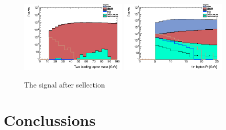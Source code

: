 \documentclass[tightenline,notitlepage,nofootinbib]{revtex4-1}
\begin{document}
\begin{figure}[!ht]
  \centering
  \includegraphics[width=0.45\textwidth]{h_llmass_cuts.png}
  \includegraphics[width=0.45\textwidth]{h_PtMuons1st_cuts.png}
  \caption{The signal after sellection}
\end{figure}


\section{Conclussions}


     
  
\end{document}
